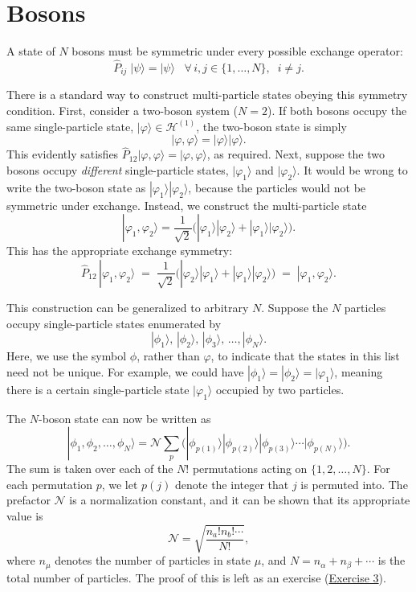 \documentclass[pra,12pt]{revtex4}
\begin{document}
\section{Bosons}

A state of $N$ bosons must be symmetric under every possible exchange
operator:
$$\hat{P}_{ij}\; |\psi\rangle = |\psi\rangle \;\;\; \forall\, i, j \in\{1,\dots,N\},\;\; i\ne j.$$

There is a standard way to construct multi-particle states obeying
this symmetry condition.  First, consider a two-boson system ($N =
2$).  If both bosons occupy the same single-particle state,
$|\varphi\rangle \in \mathscr{H}^{(1)}$, the two-boson state is simply
$$|\varphi,\varphi\rangle = |\varphi\rangle  |\varphi\rangle.$$
This evidently satisfies $\hat{P}_{12} |\varphi,\varphi\rangle =
|\varphi,\varphi\rangle$, as required.  Next, suppose the two bosons
occupy \textit{different} single-particle states, $|\varphi_1\rangle$
and $|\varphi_2\rangle$.  It would be wrong to write the two-boson
state as $|\varphi_1\rangle |\varphi_2\rangle$, because the particles
would not be symmetric under exchange.  Instead, we construct the
multi-particle state
$$|\varphi_1,\varphi_2\rangle = \frac{1}{\sqrt{2}} \Big( |\varphi_1\rangle  |\varphi_2\rangle + |\varphi_1\rangle  |\varphi_2\rangle\Big).$$
This has the appropriate exchange symmetry:
$$\hat{P}_{12}\,|\varphi_1,\varphi_2\rangle \;=\; \frac{1}{\sqrt{2}} \Big( |\varphi_2\rangle  |\varphi_1\rangle + |\varphi_1\rangle  |\varphi_2\rangle\Big) \;=\; |\varphi_1,\varphi_2\rangle.$$

This construction can be generalized to arbitrary $N$.  Suppose the
$N$ particles occupy single-particle states enumerated by
$$|\phi_1\rangle, \, |\phi_2\rangle, \, |\phi_3\rangle, \, \dots, |\phi_N\rangle.$$
Here, we use the symbol $\phi$, rather than $\varphi$, to indicate
that the states in this list need not be unique.  For example, we
could have $|\phi_1\rangle = |\phi_2\rangle = |\varphi_1\rangle$,
meaning there is a certain single-particle state $|\varphi_1\rangle$
occupied by two particles.

The $N$-boson state can now be written as
$$|\phi_1,\phi_2,\dots,\phi_N\rangle = \mathcal{N} \sum_p \Big(|\phi_{p(1)}\rangle  |\phi_{p(2)}\rangle  |\phi_{p(3)}\rangle  \cdots  |\phi_{p(N)}\rangle\Big).$$
The sum is taken over each of the $N!$ permutations acting on
$\{1,2,\dots,N\}$.  For each permutation $p$, we let $p(j)$ denote the
integer that $j$ is permuted into.  The prefactor $\mathcal{N}$ is a
normalization constant, and it can be shown that its appropriate value
is
$$\mathcal{N} = \sqrt{\frac{n_a!n_b!\cdots}{N!}},$$
where $n_\mu$ denotes the number of particles in state $\mu$, and $N =
n_\alpha + n_\beta + \cdots$ is the total number of particles.  The proof of
this is left as an exercise (\hyperref[ex:boson_norm]{Exercise 3}).
\end{document}
